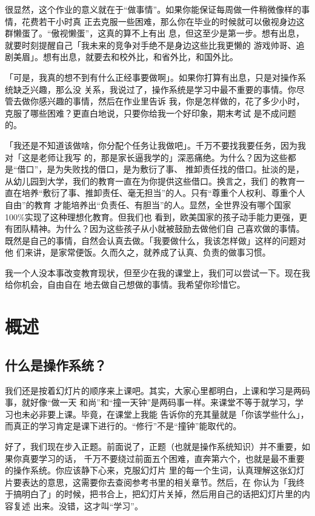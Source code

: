 \documentclass{wx672ctexart}
\begin{document}
很显然，这个作业的意义就在于“做事情”。如果你能保证每周做一件稍微像样的事情，花费若干小时真
正去克服一些困难，那么你在毕业的时候就可以傲视身边这群懒蛋了。“傲视懒蛋”，这真的算不上有出
息，但这至少是第一步。想有出息，就要时刻提醒自己「我未来的竞争对手绝不是身边这些比我更懒的
游戏帅哥、追剧美眉」。想有出息，就要去和校外比，和省外比，和国外比。

「可是，我真的想不到有什么正经事要做啊」。如果你打算有出息，只是对操作系统缺乏兴趣，那么没
关系，我说过了，操作系统是学习中最不重要的事情。你尽管去做你感兴趣的事情，然后在作业里告诉
我，你是怎样做的，花了多少小时，克服了哪些困难？更直白地说，只要你给我一个好印象，期末考试
是不成问题的。

「我还是不知道该做啥，你分配个任务让我做吧」。千万不要找我要任务，因为我对「这是老师让我写
的，那是家长逼我学的」深恶痛绝。为什么？因为这些都是“借口”，是为失败找的借口，是为敷衍了事、
推卸责任找的借口。扯淡的是，从幼儿园到大学，我们的教育一直在为你提供这些借口。换言之，我们
的教育一直在培养“敷衍了事、推卸责任、毫无担当”的人。只有“尊重个人权利、尊重个人自由”的教育
才能培养出“负责任、有胆当”的人。显然，全世界没有哪个国家100\%实现了这种理想化教育。但我们也
看到，欧美国家的孩子动手能力更强，更有团队精神。为什么？因为这些孩子从小就被鼓励去做他们自
己喜欢做的事情。既然是自己的事情，自然会认真去做。「我要做什么，我该怎样做」这样的问题对他
们来讲，是家常便饭。久而久之，就养成了认真、负责的做事习惯。

我一个人没本事改变教育现状，但至少在我的课堂上，我们可以尝试一下。现在我给你机会，自由自在
地去做自己想做的事情。我希望你珍惜它。

\restoregeometry
\section{概述}
\subsection{什么是操作系统？}
\label{sec:org22d570f}

我们还是按着幻灯片的顺序来上课吧。其实，大家心里都明白，上课和学习是两码事，就好像“做一天
和尚”和“撞一天钟”是两码事一样。来课堂不等于就学习，学习也未必非要上课。毕竟，在课堂上我能
告诉你的充其量就是「你该学些什么」，而真正的学习肯定是课下进行的。“修行”不是“撞钟”能取代的。

好了，我们现在步入正题。前面说了，正题（也就是操作系统知识）并不重要，如果你真要学习的话，
千万不要绕过前面五个困难，直奔第六个，也就是最不重要的操作系统。你应该静下心来，克服幻灯片
里的每一个生词，认真理解这张幻灯片要表达的意思，这需要你去查阅参考书里的相关章节。然后，在
你认为「我终于搞明白了」的时候，把书合上，把幻灯片关掉，然后用自己的话把幻灯片里的内容复述
出来。没错，这才叫“学习”。
\end{document}
